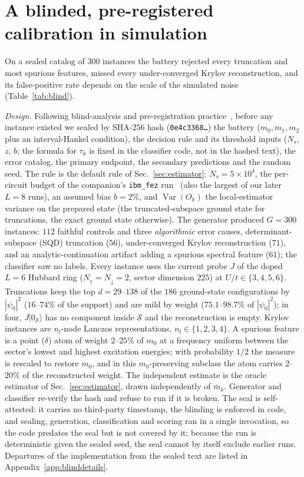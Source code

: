\documentclass[submission, PhysCore]{SciPost}
\begin{document}
\section{A blinded, pre-registered calibration in simulation}
\label{sec:blind}
On a sealed catalog of $300$ instances the battery rejected every truncation and most spurious features, missed every under-converged Krylov reconstruction, and its false-positive rate depends on the scale of the simulated noise (Table~\ref{tab:blind}).

\emph{Design.} Following blind-analysis and pre-registration practice~\cite{KleinRoodman2005,Nosek2018}, before any instance existed we sealed by SHA-256 hash (\texttt{0e4c3368\ldots}) the battery ($m_0,m_1,m_2$ plus an interval-Hankel condition), the decision rule and its threshold inputs ($N_s$, $z$, $b$; the formula for $\tau_k$ is fixed in the classifier code, not in the hashed text), the error catalog, the primary endpoint, the secondary predictions and the random seed. The rule is the default rule of Sec.~\ref{sec:estimator}: $N_s=5\times10^4$, the per-circuit budget of the companion's \texttt{ibm\_fez} run~\cite{SQDspec2608} (also the largest of our later $L=8$ runs), an assumed bias $b=2\%$, and $\operatorname{Var}(O_k)$ the local-estimator variance on the prepared state (the truncated-subspace ground state for truncations, the exact ground state otherwise). The generator produced $G=300$ instances: $112$ faithful controls and three \emph{algorithmic} error causes, determinant-subspace (SQD) truncation ($56$), under-converged Krylov reconstruction ($71$), and an analytic-continuation artifact adding a spurious spectral feature ($61$); the classifier saw no labels. Every instance uses the current probe $J$ of the doped $L=6$ Hubbard ring ($N_\uparrow=N_\downarrow=2$, sector dimension $225$) at $U/t\in\{3,4,5,6\}$. Truncations keep the top $d=29$--$138$ of the $186$ ground-state configurations by $|\psi_0|^2$ (\mbox{$16$--$74\%$} of the support) and are mild by weight ($75.1$--$98.7\%$ of $|\psi_0|^2$); in four, $J|0_\mathcal{S}\rangle$ has no component inside $\mathcal{S}$ and the reconstruction is empty. Krylov instances are $n_l$-node Lanczos representations, $n_l\in\{1,2,3,4\}$. A spurious feature is a point ($\delta$) atom of weight $2$--$25\%$ of $m_0$ at a frequency uniform between the sector's lowest and highest excitation energies; with probability $1/2$ the measure is rescaled to restore $m_0$, and in this $m_0$-preserving subclass the atom carries \mbox{$2$--$20\%$} of the reconstructed weight. The independent estimate is the oracle estimator of Sec.~\ref{sec:estimator}, drawn independently of $\bar m_k$. Generator and classifier re-verify the hash and refuse to run if it is broken. The seal is self-attested: it carries no third-party timestamp, the blinding is enforced in code, and sealing, generation, classification and scoring ran in a single invocation, so the code predates the seal but is not covered by it; because the run is deterministic given the sealed seed, the seal cannot by itself exclude earlier runs. Departures of the implementation from the sealed text are listed in Appendix~\ref{app:blinddetails}.
\end{document}
